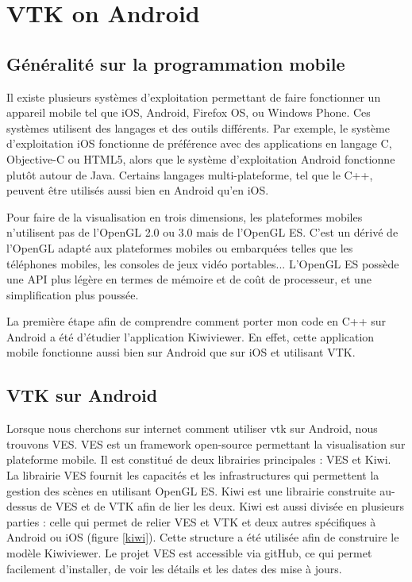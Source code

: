 \documentclass[a4paper,12pt]{article}
\begin{document}
\newpage
\section{VTK on Android}
	\subsection{Généralité sur la programmation mobile}

Il existe plusieurs systèmes d'exploitation permettant de faire fonctionner un appareil mobile tel que iOS, Android, Firefox OS, ou Windows Phone. Ces systèmes utilisent des langages et des outils différents. Par exemple, le système d'exploitation iOS fonctionne de préférence avec des applications en langage C, Objective-C ou HTML5, alors que le système d'exploitation Android fonctionne plutôt autour de Java. Certains langages multi-plateforme, tel que le C++, peuvent être utilisés aussi bien en Android qu'en iOS. 
	
	Pour faire de la visualisation en trois dimensions, les plateformes mobiles n'utilisent pas de l'OpenGL 2.0 ou 3.0  mais de l'OpenGL ES. C'est un dérivé de l'OpenGL adapté aux plateformes mobiles ou embarquées telles que les téléphones mobiles, les consoles de jeux vidéo portables... L'OpenGL ES possède une API plus légère en termes de mémoire et de coût de processeur, et une simplification plus poussée.
	
	La première étape afin de comprendre comment porter mon code en C++ sur Android a été d'étudier l'application Kiwiviewer. En effet, cette application  mobile fonctionne aussi bien sur Android que sur iOS et utilisant VTK.

	\subsection{VTK sur Android}
	Lorsque nous cherchons sur internet comment utiliser vtk sur Android, nous trouvons VES. VES est un framework open-source permettant la visualisation sur plateforme mobile. Il est constitué de deux librairies principales : VES et Kiwi. La librairie VES fournit les capacités et les infrastructures qui permettent la gestion des scènes en utilisant OpenGL ES. Kiwi est une librairie construite au-dessus de VES et de VTK afin de lier les deux. Kiwi est aussi divisée en plusieurs parties : celle qui permet de relier VES et VTK et deux autres spécifiques à Android ou iOS (figure \ref{kiwi}). Cette structure a été utilisée afin de construire le modèle Kiwiviewer. Le projet VES est accessible via gitHub, ce qui permet facilement d'installer, de voir les détails et les dates des mise à jours. 
	
\end{document}

